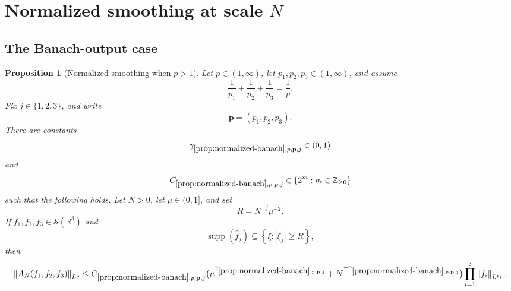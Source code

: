 \documentclass[11pt]{article}
\newtheorem{proposition}[theorem]{Proposition}
\newcommand{\R}{\mathbb{R}}
\newcommand{\Sch}{\mathcal{S}}
\newcommand{\supp}{\operatorname{supp}}
\newcommand{\norm}[2]{\left\lVert #1\right\rVert_{#2}}
\newcommand{\Cst}[2]{C_{\ref{#1},#2}}
\newcommand{\Gam}[2]{\gamma_{\ref{#1},#2}}
\newcommand{\abs}[1]{\left|#1\right|}
\newcommand{\set}[1]{\left\{#1\right\}}
\newcommand{\indices}{\{1,2,3\}}
\begin{document}
	\section{Normalized smoothing at scale \(N\)}
	
	\subsection{The Banach-output case}
	
	\begin{proposition}[Normalized smoothing when \(p>1\)]\label{prop:normalized-banach}
		Let \(p\in(1,\infty)\), let \(p_1,p_2,p_3\in(1,\infty)\), and assume
		\[
		\frac1{p_1}+\frac1{p_2}+\frac1{p_3}=\frac1p.
		\]
		Fix \(j\in\indices\), and write
		\[
		\mathbf p=(p_1,p_2,p_3).
		\]
		There are constants
		\[
		\Gam{prop:normalized-banach}{p,\mathbf p,j}\in(0,1)
		\]
		and
		\[
		\Cst{prop:normalized-banach}{p,\mathbf p,j}\in\set{2^m:m\in\mathbb Z_{\geq0}}
		\]
		such that the following holds.  Let \(N>0\), let \(\mu\in(0,1]\), and set
		\[
		R=N^{-j}\mu^{-2}.
		\]
		If \(f_1,f_2,f_3\in\Sch(\R^3)\) and
		\[
		\supp(\widehat f_j)\subseteq\set{\xi:\abs{\xi_j}\geq R},
		\]
		then
		\[
		\norm{A_N(f_1,f_2,f_3)}{L^p}
		\leq
		\Cst{prop:normalized-banach}{p,\mathbf p,j}
		\bigl(\mu^{\Gam{prop:normalized-banach}{p,\mathbf p,j}}
		+N^{-\Gam{prop:normalized-banach}{p,\mathbf p,j}}\bigr)
		\prod_{i=1}^{3}\norm{f_i}{L^{p_i}}.
		\]
	\end{proposition}
	
\end{document}
